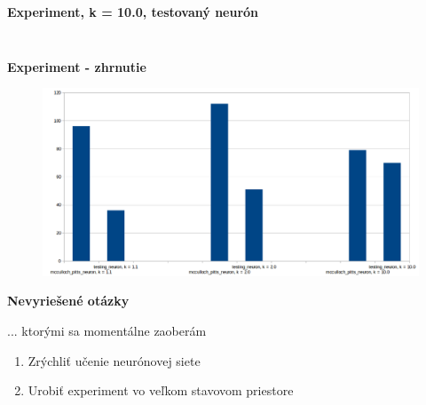 \documentclass[xcolor=dvipsnames]{beamer}
\begin{document}
\begin{frame}{\bf Experiment, k = 10.0, testovaný neurón}
\begin{columns}
\begin{column}{0.5\textwidth}
\begin{figure}[ht]
        \end{figure}

	\end{column}
\end{columns}

\end{frame}






\begin{frame}[fragile]{\bf Experiment - zhrnutie}

\begin{figure}[ht]
\begin{center}
\begin{minipage}{0.8\linewidth}
\begin{center}
  \includegraphics[width=1.0\textwidth]{comparsion.png}
\end{center}
\end{minipage}
\end{center}
\end{figure}

\end{frame}



\begin{frame}[fragile]{\bf Nevyriešené otázky}

    ... ktorými sa momentálne zaoberám

	\begin{enumerate}
	\item{Zrýchliť učenie neurónovej siete}
	\item{Urobiť experiment vo veľkom stavovom priestore}
	\end{enumerate}

\end{frame}
\end{document}
